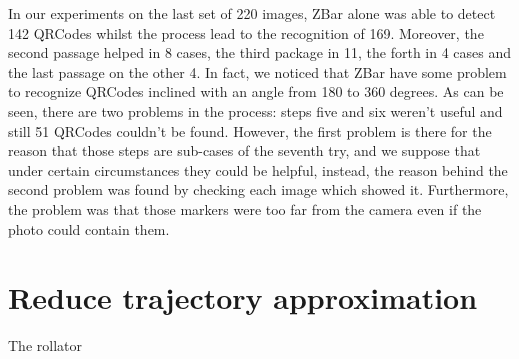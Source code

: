In our experiments on the last set of 220 images, ZBar alone was able to detect 142 QRCodes whilst the process lead to the recognition of 169. Moreover, the second passage helped in 8 cases, the third package in 11, the forth in 4 cases and the last passage on the other 4. In fact, we noticed that ZBar have some problem to recognize QRCodes inclined with an angle from 180 to 360 degrees.
As can be seen, there are two problems in the process: steps five and six weren't useful and still 51 QRCodes couldn't be found. However, the first problem is there for the reason that those steps are sub-cases of the seventh try, and we suppose that under certain circumstances they could be helpful, instead, the reason behind the second problem was found by checking each image which showed it. Furthermore, the problem was that those markers were too far from the camera even if the photo could contain them.

\section{Reduce trajectory approximation}
The rollator 


